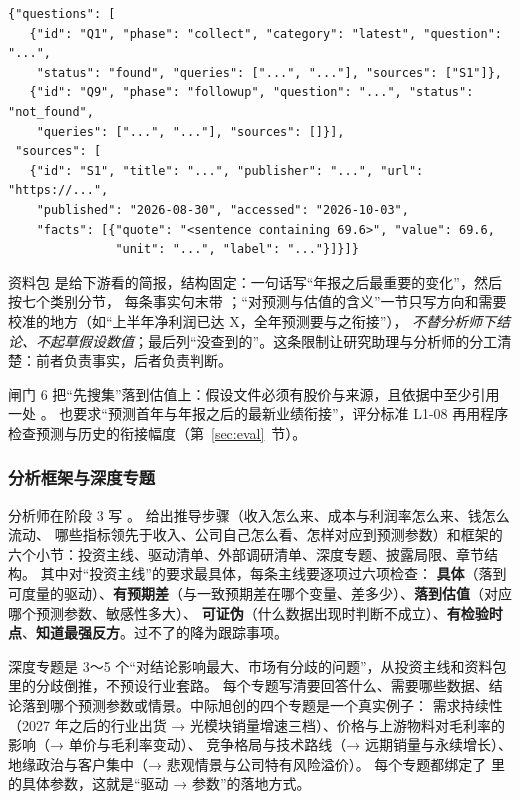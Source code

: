 \begin{lstlisting}[caption={\file{research/sources.json} 的结构（字段名为真实字段，取值为占位）},label={lst:pipe-sources}]
{"questions": [
   {"id": "Q1", "phase": "collect", "category": "latest", "question": "...",
    "status": "found", "queries": ["...", "..."], "sources": ["S1"]},
   {"id": "Q9", "phase": "followup", "question": "...", "status": "not_found",
    "queries": ["...", "..."], "sources": []}],
 "sources": [
   {"id": "S1", "title": "...", "publisher": "...", "url": "https://...",
    "published": "2026-08-30", "accessed": "2026-10-03",
    "facts": [{"quote": "<sentence containing 69.6>", "value": 69.6,
               "unit": "...", "label": "..."}]}]}
\end{lstlisting}

资料包  是给下游看的简报，结构固定：一句话写“年报之后最重要的变化”，然后按七个类别分节，
每条事实句末带 \code{[S编号]}；“对预测与估值的含义”一节只写方向和需要校准的地方（如“上半年净利润已达 X，全年预测要与之衔接”），
\emph{不替分析师下结论、不起草假设数值}；最后列“没查到的”。这条限制让研究助理与分析师的分工清楚：前者负责事实，后者负责判断。

闸门 6 把“先搜集”落到估值上：假设文件必须有股价与来源，且依据中至少引用一处 \code{[S编号]}。
 也要求“预测首年与年报之后的最新业绩衔接”，评分标准 L1-08 再用程序检查预测与历史的衔接幅度（第~\ref{sec:eval}~节）。

\subsubsection{分析框架与深度专题}

分析师在阶段 3 写 。 给出推导步骤（收入怎么来、成本与利润率怎么来、钱怎么流动、
哪些指标领先于收入、公司自己怎么看、怎样对应到预测参数）和框架的六个小节：投资主线、驱动清单、外部调研清单、深度专题、披露局限、章节结构。
其中对“投资主线”的要求最具体，每条主线要逐项过六项检查：
\textbf{具体}（落到可度量的驱动）、\textbf{有预期差}（与一致预期差在哪个变量、差多少）、\textbf{落到估值}（对应哪个预测参数、敏感性多大）、
\textbf{可证伪}（什么数据出现时判断不成立）、\textbf{有检验时点}、\textbf{知道最强反方}。过不了的降为跟踪事项。

深度专题是 3～5 个“对结论影响最大、市场有分歧的问题”，从投资主线和资料包里的分歧倒推，不预设行业套路。
每个专题写清要回答什么、需要哪些数据、结论落到哪个预测参数或情景。中际旭创的四个专题是一个真实例子：
需求持续性（2027 年之后的行业出货 → 光模块销量增速三档）、价格与上游物料对毛利率的影响（→ 单价与毛利率变动）、
竞争格局与技术路线（→ 远期销量与永续增长）、地缘政治与客户集中（→ 悲观情景与公司特有风险溢价）。
每个专题都绑定了  里的具体参数，这就是“驱动 → 参数”的落地方式。

